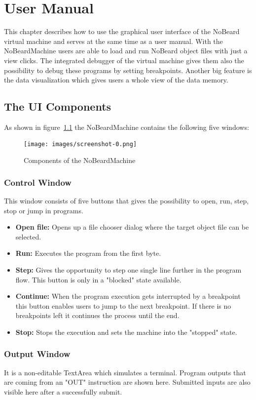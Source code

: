 \chapter{User Manual}
This chapter describes how to use the graphical user interface of the NoBeard virtual machine and serves at the same time as a user manual.
With the NoBeardMachine users are able to load and run NoBeard object files with just a view clicks. The integrated debugger of the virtual machine gives them also the possibility to debug these programs by setting breakpoints. Another big feature is the data visualization which gives users a whole view of the data memory.
\section{The UI Components}
As shown in figure~\ref{fig:components} the NoBeardMachine contains the following five windows:
\begin{figure}[h] 
	\centering
	\texttt{[image: images/screenshot-0.png]}
	\caption{Components of the NoBeardMachine}
	\label{fig:components}
\end{figure}
\subsection{Control Window}
This window consists of five buttons that gives the possibility to open, run, step, stop or jump in programs. 
\begin{itemize}
\item \textbf{Open file: }Opens up a file chooser dialog where the target object file can be selected.
\item \textbf{Run: }Executes the program from the first byte.
\item \textbf{Step: }Gives the opportunity to step one single line further in the program flow. This button is only in a "blocked" state available.
\item \textbf{Continue: }When the program execution gets interrupted by a breakpoint this button enables users to jump to the next breakpoint. If there is no breakpoints left it continues the process until the end.
\item \textbf{Stop: }Stops the execution and sets the machine into the "stopped" state.
\end{itemize}
\subsection{Output Window}
It is a non-editable TextArea which simulates a terminal. Program outputs that are coming from an "OUT" instruction are shown here. Submitted inputs are also visible here after a successfully submit.
